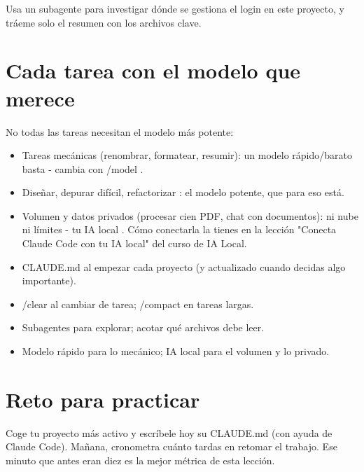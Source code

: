 \documentclass[11pt,a4paper]{book}
\begin{document}
\begin{codebox}
Usa un subagente para investigar dónde se gestiona el login
en este proyecto, y tráeme solo el resumen con los archivos clave.
\end{codebox}
\section{Cada tarea con el modelo que merece}
No todas las tareas necesitan el modelo más potente:

\begin{itemize}\item Tareas mecánicas (renombrar, formatear, resumir): un modelo rápido/barato basta - cambia con /model .\end{itemize}
\begin{itemize}\item Diseñar, depurar difícil, refactorizar : el modelo potente, que para eso está.\end{itemize}
\begin{itemize}\item Volumen y datos privados (procesar cien PDF, chat con documentos): ni nube ni límites - tu IA local . Cómo conectarla la tienes en la lección "Conecta Claude Code con tu IA local" del curso de IA Local.\end{itemize}
\begin{itemize}\item CLAUDE.md al empezar cada proyecto (y actualizado cuando decidas algo importante).\end{itemize}
\begin{itemize}\item /clear al cambiar de tarea; /compact en tareas largas.\end{itemize}
\begin{itemize}\item Subagentes para explorar; acotar qué archivos debe leer.\end{itemize}
\begin{itemize}\item Modelo rápido para lo mecánico; IA local para el volumen y lo privado.\end{itemize}
\section{Reto para practicar}
Coge tu proyecto más activo y escríbele hoy su CLAUDE.md (con ayuda de Claude Code). Mañana, cronometra cuánto tardas en retomar el trabajo. Ese minuto que antes eran diez es la mejor métrica de esta lección.
\end{document}
